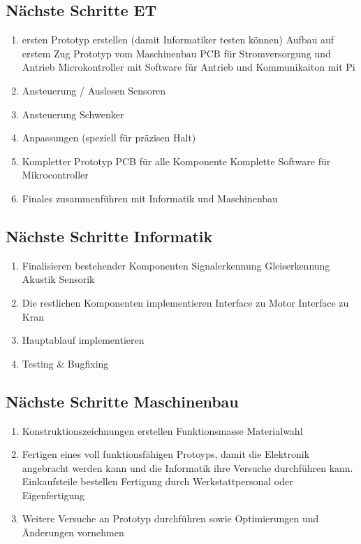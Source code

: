 \documentclass[../../main.tex]{subfiles}
\begin{document}
\subsection{Nächste Schritte ET}
\begin{enumerate}
    \item ersten Prototyp erstellen (damit Informatiker testen können)
        \subitem Aufbau auf erstem Zug Prototyp vom Maschinenbau
        \subitem PCB für Stromversorgung und Antrieb
        \subitem Microkontroller mit Software für Antrieb und Kommunikaiton mit Pi
    \item Ansteuerung / Auslesen Sensoren
    \item Ansteuerung Schwenker
    \item Anpassungen (speziell für präzisen Halt)
    \item Kompletter Prototyp
        \subitem PCB für alle Komponente
        \subitem Komplette Software für Mikrocontroller
    \item Finales zusammenführen mit Informatik und Maschinenbau
\end{enumerate}

\subsection{Nächste Schritte Informatik}
\begin{enumerate}
    \item Finalisieren bestehender Komponenten
        \subitem Signalerkennung
        \subitem Gleiserkennung
        \subitem Akustik
        \subitem Sensorik
    \item Die restlichen Komponenten implementieren
        \subitem Interface zu Motor
        \subitem Interface zu Kran
    \item Hauptablauf implementieren
    \item Testing \& Bugfixing
\end{enumerate}

\subsection{Nächste Schritte Maschinenbau}
\begin{enumerate}
    \item Konstruktionszeichnungen erstellen
    \subitem Funktionsmasse
    \subitem Materialwahl
    \item Fertigen eines voll funktionsfähigen Protoyps, damit die Elektronik angebracht werden kann und die Informatik ihre Versuche durchführen kann.
    \subitem Einkaufsteile bestellen
    \subitem Fertigung durch Werkstattpersonal oder Eigenfertigung
    \item Weitere Versuche an Prototyp durchführen sowie Optimierungen und Änderungen vornehmen
\end{enumerate}
\end{document}
